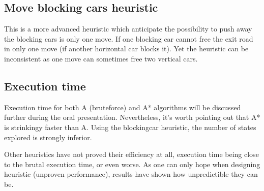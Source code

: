 \documentclass[10pt,a4paper]{article}
\begin{document}
\subsection{Move blocking cars heuristic}
This is a more advanced heuristic which anticipate the possibility to push away the blocking cars is only one move. If one blocking car cannot free the exit road in only one move (if another horizontal car blocks it). Yet the heuristic can be inconsistent as one move can sometimes free two vertical cars.

\subsection{Execution time}

Execution time for both A (bruteforce) and A* algorithms will be discussed further during the oral presentation. Nevertheless, it's worth pointing out that A* is strinkingy faster than A. Using the blockingcar heuristic, the number of states explored is strongly inferior.


Other heuristics have not proved their efficiency at all, execution time being close to the brutal execution time, or even worse. As one can only hope when designing heuristic (unproven performance), results have shown how unpredictible they can be.
\end{document}
